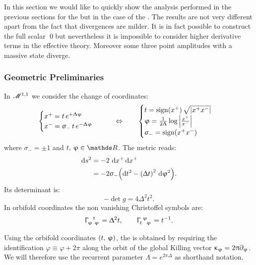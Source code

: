 In this section we would like to quickly show the analysis performed in the previous sections for the \nbo but in the case of the \bo.
The results are not very different apart from the fact that divergences are milder.
It is in fact possible to construct the full scalar \qed but nevertheless it is impossible to consider higher derivative terms in the effective theory.
Moreover some three point amplitudes with a massive state diverge.


\subsubsection{Geometric Preliminaries}

In $\mathscr{M}^{1,1}$ we consider the change of coordinates:
\begin{equation}
  \begin{cases}
    x^+ = t\, e^{+ \Updelta \upvarphi}
    \\
    x^- = \upsigma_-\, t\, e^{- \Updelta \upvarphi}
  \end{cases}
  \qquad
  \Leftrightarrow
  \qquad
  \begin{cases}
    t = \mathrm{sign}(x^+)\, \sqrt{ \abs{x^+ x^-} }
    \\
    \upvarphi = \frac{ 1 }{ 2 \Updelta} \log \abs{\frac{x^+}{x^-}}
    \\
    \upsigma_- = \mathrm{sign}( x^+ x^-)
  \end{cases}
\end{equation}
where $\sigma_- = \pm 1$ and $t,\, \varphi \in \R$.
The metric reads:
\begin{equation}
  \begin{split}
    \dss[2]{s}
    & =
    -2\, \dd{x^+} \dd{x^+}
    \\
    & = -2 \sigma_- \qty( \dss[2]{t} - \qty(\Delta t)^2\, \dss[2]{\varphi} ).
  \end{split}
\end{equation}
Its determinant is:
\begin{equation}
  -\det g = 4 \Delta^2 t^2.
\end{equation}
In orbifold coordinates the non vanishing Christoffel symbols are:
\begin{equation}
  \tensor{\Gamma}{_\varphi^t_\varphi} = \Delta^2 t,
  \qquad
  \tensor{\Gamma}{_t^\varphi_\varphi} = t^{-1}.
\end{equation}

Using the orbifold coordinates $\qty(t,\, \upvarphi)$, the \bo is obtained by requiring the identification $\varphi \equiv \varphi + 2 \pi$ along the orbit of the global Killing vector $\upkappa_{\upvarphi} = 2 \uppi \partial_{\upvarphi}$.
We will therefore use the recurrent parameter $\Lambda = e^{2\pi \Delta}$ as shorthand notation.


